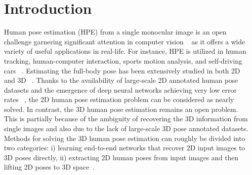 \section{Introduction}


Human pose estimation (HPE) from a single monocular image is an open challenge garnering significant attention in computer vision ~\cite{DBLP:journals/corr/PavlakosZDD16} as it offers a wide variety of useful applications in real-life.
For instance, HPE is utilized in human tracking, human-computer interaction, sports motion analysis, and self-driving cars ~\cite{chen_monocular_2020}.
Estimating the full-body pose has been extensively studied in both 2D and 3D ~\cite{sun_compositional_2017}.
Thanks to the availability of large-scale 2D annotated human pose datasets and
the emergence of deep neural networks achieving very low
error rates ~\cite{yang2020transpose, bulat2020skip, su2019multi},
the 2D human pose estimation problem can be considered as nearly solved.
In contrast, the 3D human pose estimation remains an open problem.
This is partially because of the ambiguity of recovering the 3D information from single images and also due to the lack of large-scale 3D pose annotated datasets.
Methods for solving the 3D human pose estimation can roughly be divided into two categories:
i) learning end-to-end networks that recover 2D input images to 3D poses directly,
ii) extracting 2D human poses from input images and then lifting 2D poses to 3D
space~\cite{DBLP:journals/corr/abs-1710-06513}.



